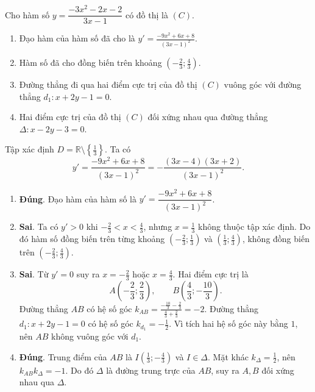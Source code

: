 \begin{baitap}
	Cho hàm số $y=\dfrac{-3x^2-2x-2}{3x-1}$ có đồ thị là $(C)$. 
	\begin{enumerate}
		\item Đạo hàm của hàm số đã cho là $y'=\frac{-9x^2+6x+8}{(3x-1)^2}$.
		\item Hàm số đã cho đồng biến trên khoảng $\left(-\frac{2}{3}; \frac{4}{3}\right)$.
		\item Đường thẳng đi qua hai điểm cực trị của đồ thị $(C)$ vuông góc với đường thẳng $d_1 : x+2y-1=0$.
		\item Hai điểm cực trị của đồ thị $(C)$ đối xứng nhau qua đường thẳng $\Delta : x-2y-3=0$.
	\end{enumerate}
	\begin{traloi}
		Tập xác định $D=\mathbb{R}\setminus\left\{\frac13\right\}$. Ta có
		\[
		y'=\frac{-9x^2+6x+8}{(3x-1)^2}
		=-\frac{(3x-4)(3x+2)}{(3x-1)^2}.
		\]
		
		\begin{enumerate}
			\item \textbf{Đúng}. Đạo hàm của hàm số là
			$y'=\dfrac{-9x^2+6x+8}{(3x-1)^2}$.
			
			\item \textbf{Sai}. Ta có $y'>0$ khi $-\frac23<x<\frac43$, nhưng $x=\frac13$ không thuộc tập xác định. Do đó hàm số đồng biến trên từng khoảng
			$\left(-\frac23;\frac13\right)$ và $\left(\frac13;\frac43\right)$, không đồng biến trên $\left(-\frac23;\frac43\right)$.
			
			\item \textbf{Sai}. Từ $y'=0$ suy ra $x=-\frac23$ hoặc $x=\frac43$. Hai điểm cực trị là
			\[
			A\left(-\frac23;\frac23\right),\qquad
			B\left(\frac43;-\frac{10}{3}\right).
			\]
			Đường thẳng $AB$ có hệ số góc
			$k_{AB}=\frac{-\frac{10}{3}-\frac23}{\frac43+\frac23}=-2$.
			Đường thẳng $d_1:x+2y-1=0$ có hệ số góc $k_{d_1}=-\frac12$. Vì tích hai hệ số góc này  bằng $ 1 $, nên $AB$ không vuông góc với $d_1$.
			
			\item \textbf{Đúng}. Trung điểm của $AB$ là $I\left(\frac13;-\frac43\right)$ và $I\in\Delta$. Mặt khác $k_{\Delta}=\frac12$, nên $k_{AB}k_{\Delta}=-1$. Do đó $\Delta$ là đường trung trực của $AB$, suy ra $A,B$ đối xứng nhau qua $\Delta$.
		\end{enumerate}
	\end{traloi}
	\end{baitap}

